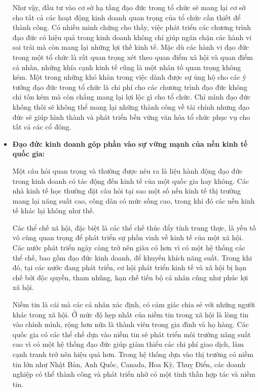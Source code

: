 \documentclass{article}
\begin{document}
\begin{itemize}
                \qquad Như vậy, đầu tư vào cơ sở hạ tầng đạo đức trong tổ chức sẽ mang lại cơ sở cho tất cả các hoạt động kinh doanh quan trọng của tổ chức cần thiết để thành công. Có nhiều minh chứng cho thấy, việc phát triển các chương trình đạo đức có hiệu quả trong kinh doanh không chỉ giúp ngăn chặn các hành vi sai trái mà còn mang lại những lợi thế kinh tế. Mặc dù các hành vi đạo đức trong một tổ chức là rất quan trọng xét theo quan điểm xã hội và quan điểm cá nhân, những khía cạnh kinh tế cũng là một nhân tố quan trọng không kém. Một trong những khó khăn trong việc dành được sự ủng hộ cho các ý tưởng đạo đức trong tổ chức là chi phí cho các chương trình đạo đức không chỉ tốn kém mà còn chẳng mang lại lợi lộc gì cho tổ chức. Chỉ mình đạo đức không thôi sẽ không thể mang lại những thành công về tài chính nhưng đạo đức sẽ giúp hình thành và phát triển bền vững văn hóa tổ chức phục vụ cho tất cả các cổ đông.

                \item \textbf{Đạo đức kinh doanh góp phần vào sự vững mạnh của nền kinh tế quốc gia:}
                
                \qquad Một câu hỏi quan trọng và thường được nêu ra là liệu hành động đạo đức trong kinh doanh có tác động đến kinh tế của một quốc gia hay không. Các nhà kinh tế học thường đặt câu hỏi tại sao một số nền kinh tế thị trường mang lại năng suất cao, công dân có mức sống cao, trong khi đó các nền kinh tế khác lại không như thế.

                \qquad Các thể chế xã hội, đặc biệt là các thể chế thúc đẩy tính trung thực, là yếu tố vô cùng quan trọng để phát triển sự phồn vinh về kinh tế của một xã hội. Các nước phát triển ngày càng trở nên giàu có hơn vì có một hệ thống các thể chế, bao gồm đạo đức kinh doanh, để khuyến khích năng suất. Trong khi đó, tại các nước đang phát triển, cơ hội phát triển kinh tế và xã hội bị hạn chế bởi độc quyền, tham nhũng, hạn chế tiến bộ cá nhân cũng như phúc lợi xã hội.

                \qquad Niềm tin là cái mà các cá nhân xác định, có cảm giác chia sẻ với những người khác trong xã hội. Ở mức độ hẹp nhất của niềm tin trong xã hội là lòng tin vào chính mình, rộng hơn nữa là thành viên trong gia đình và họ hàng. Các quốc gia có các thể chế dựa vào niềm tin sẽ phát triển môi trường năng suất cao vì có một hệ thống đạo đức giúp giảm thiểu các chi phí giao dịch, làm cạnh tranh trở nên hiệu quả hơn. Trong hệ thống dựa vào thị trường có niềm tin lớn như Nhật Bản, Anh Quốc, Canada, Hoa Kỳ, Thuỵ Điển, các doanh nghiệp có thể thành công và phát triển nhờ có một tinh thần hợp tác và niềm tin.


\end{itemize}
\end{document}
